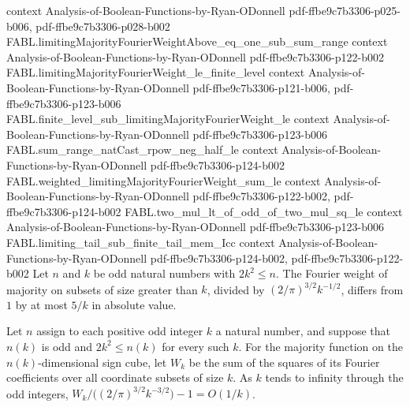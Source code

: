 \begin{theorem}
  {context}
  {Analysis-of-Boolean-Functions-by-Ryan-ODonnell}
  {pdf-ffbe9c7b3306-p025-b006,
    pdf-ffbe9c7b3306-p028-b002}
\proofstep
  {FABL.limitingMajorityFourierWeightAbove_eq_one_sub_sum_range}
  {context}
  {Analysis-of-Boolean-Functions-by-Ryan-ODonnell}
  {pdf-ffbe9c7b3306-p122-b002}
\proofstep
  {FABL.limitingMajorityFourierWeight_le_finite_level}
  {context}
  {Analysis-of-Boolean-Functions-by-Ryan-ODonnell}
  {pdf-ffbe9c7b3306-p121-b006,
    pdf-ffbe9c7b3306-p123-b006}
\proofstep
  {FABL.finite_level_sub_limitingMajorityFourierWeight_le}
  {context}
  {Analysis-of-Boolean-Functions-by-Ryan-ODonnell}
  {pdf-ffbe9c7b3306-p123-b006}
\proofstep
  {FABL.sum_range_natCast_rpow_neg_half_le}
  {context}
  {Analysis-of-Boolean-Functions-by-Ryan-ODonnell}
  {pdf-ffbe9c7b3306-p124-b002}
\proofstep
  {FABL.weighted_limitingMajorityFourierWeight_sum_le}
  {context}
  {Analysis-of-Boolean-Functions-by-Ryan-ODonnell}
  {pdf-ffbe9c7b3306-p122-b002,
    pdf-ffbe9c7b3306-p124-b002}
\proofstep
  {FABL.two_mul_lt_of_odd_of_two_mul_sq_le}
  {context}
  {Analysis-of-Boolean-Functions-by-Ryan-ODonnell}
  {pdf-ffbe9c7b3306-p123-b006}
\proofstep
  {FABL.limiting_tail_sub_finite_tail_mem_Icc}
  {context}
  {Analysis-of-Boolean-Functions-by-Ryan-ODonnell}
  {pdf-ffbe9c7b3306-p124-b002,
    pdf-ffbe9c7b3306-p122-b002}
Let $n$ and $k$ be odd natural numbers with $2k^2 \le n$. The Fourier weight of
majority on subsets of size greater than $k$, divided by $(2/\pi)^{3/2}k^{-1/2}$,
differs from $1$ by at most $5/k$ in absolute value.
\end{theorem}

\begin{theorem}
\label{FABL.majorityFourierLevel_family_relativeError_isBigO}
\leanok
{}
Let $n$ assign to each positive odd integer $k$ a natural number, and suppose that
$n(k)$ is odd and $2k^2\le n(k)$ for every such $k$. For the majority function on the
$n(k)$-dimensional sign cube, let $W_k$ be the sum of the squares of its Fourier
coefficients over all coordinate subsets of size $k$. As $k$ tends to infinity through
the odd integers, $W_k/\bigl((2/\pi)^{3/2}k^{-3/2}\bigr)-1=O(1/k)$.
\end{theorem}


